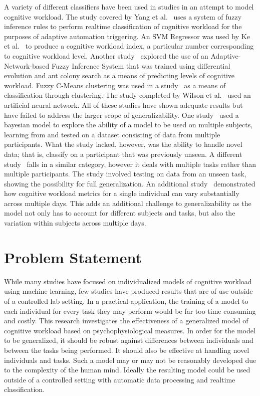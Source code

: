 \documentclass[11pt]{article}
\begin{document}
A variety of different classifiers have been used in studies in an attempt to model cognitive workload. The study covered by Yang et al.~\cite{Yang} uses a system of fuzzy inference rules to perform realtime classification of cognitive workload for the purposes of adaptive automation triggering. An SVM Regressor was used by Ke et al.~\cite{Ke} to produce a cognitive workload index, a particular number corresponding to cognitive workload level. Another study~\cite{Wang_R} explored the use of an Adaptive-Network-based Fuzzy Inference System that was trained using differential evolution and ant colony search as a means of predicting levels of cognitive workload. Fuzzy C-Means clustering was used in a study~\cite{Zhang} as a means of classification through clustering. The study completed by Wilson et al.~\cite{Wilson} used an artificial neural network. All of these studies have shown adequate results but have failed to address the larger scope of generalizability. One study~\cite{Wang_Z} used a bayesian model to explore the ability of a model to be used on multiple subjects, learning from and tested on a dataset consisting of data from multiple participants. What the study lacked, however, was the ability to handle novel data; that is, classify on a participant that was previously unseen. A different study~\cite{Ke} falls in a similar category, however it deals with multiple tasks rather than multiple participants. The study involved testing on data from an unseen task,  showing the possibility for full generalization. An additional study~\cite{Christensen} demonstrated how cognitive workload metrics for a single individual can vary substantially across multiple days. This adds an additional challenge to generalizability as the model not only has to account for different subjects and tasks, but also the variation within subjects across multiple days.


\section{Problem Statement}
While many studies have focused on individualized models of cognitive workload using machine learning, few studies have produced results that are of use outside of a controlled lab setting. In a practical application, the training of a model to each individual for every task they may perform would be far too time consuming and costly. This research investigates the effectiveness of a generalized model of cognitive workload based on psychophysiological measures. In order for the model to be generalized, it should be robust against differences between individuals and between the tasks being performed. It should also be effective at handling novel individuals and tasks. Such a model may or may not be reasonably developed due to the complexity of the human mind. Ideally the resulting model could be used outside of a controlled setting with automatic data processing and realtime classification.
\end{document}
